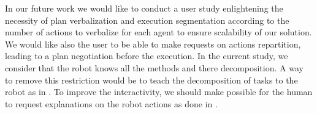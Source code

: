 \documentclass{llncs}
\begin{document}
In our future work we would like to conduct a user study enlightening the necessity of  plan verbalization and execution segmentation according to the number of actions to verbalize for each agent to ensure scalability of our solution.
We would like also the user to be able to make requests on actions repartition, leading to a plan negotiation before the execution.
In the current study, we consider that the robot knows all the methods and there decomposition. A way to remove this restriction would be to teach the decomposition of tasks to the robot as in \cite{Mohseni2015}.
To improve the interactivity, we should make possible for the human to request explanations on the robot actions as done in \cite{Lomas2012}.



%


\end{document}
